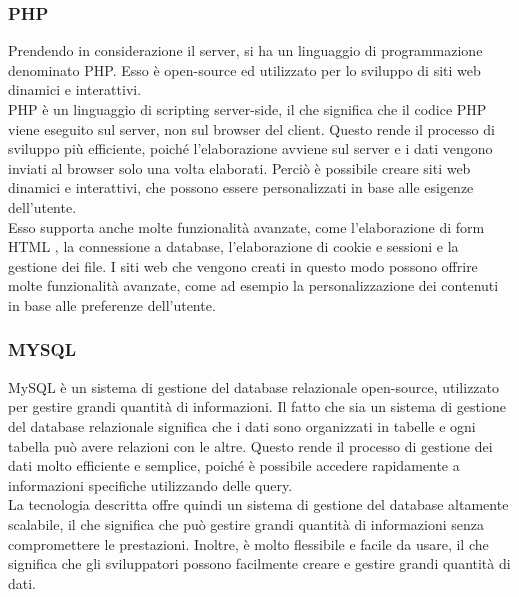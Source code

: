 \documentclass[a4paper,final,12pt]{report}
\begin{document}
\subsubsection{PHP}
Prendendo in considerazione il server, si ha un linguaggio di programmazione denominato PHP. Esso è open-source ed utilizzato per lo sviluppo di siti web dinamici e interattivi. \\ PHP è un linguaggio di scripting server-side, il che significa che il codice PHP viene eseguito sul server, non sul browser del client. Questo rende il processo di sviluppo più efficiente, poiché l'elaborazione avviene sul server e i dati vengono inviati al browser solo una volta elaborati. Perciò è possibile creare siti web dinamici e interattivi, che possono essere personalizzati in base alle esigenze dell'utente. \\ Esso supporta anche molte funzionalità avanzate, come l'elaborazione di form HTML \cite{HTML}, la connessione a database, l'elaborazione di cookie e sessioni e la gestione dei file. I siti web che vengono creati in questo modo possono offrire molte funzionalità avanzate, come ad esempio la personalizzazione dei contenuti in base alle preferenze dell'utente.

\subsubsection{MYSQL}
MySQL è un sistema di gestione del database relazionale open-source, utilizzato per gestire grandi quantità di informazioni. Il fatto che sia un sistema di gestione del database relazionale significa che i dati sono organizzati in tabelle e ogni tabella può avere relazioni con le altre. Questo rende il processo di gestione dei dati molto efficiente e semplice, poiché è possibile accedere rapidamente a informazioni specifiche utilizzando delle query.\\
La tecnologia descritta offre quindi un sistema di gestione del database altamente scalabile, il che significa che può gestire grandi quantità di informazioni senza compromettere le prestazioni. Inoltre, è molto flessibile e facile da usare, il che significa che gli sviluppatori possono facilmente creare e gestire grandi quantità di dati.
\end{document}
